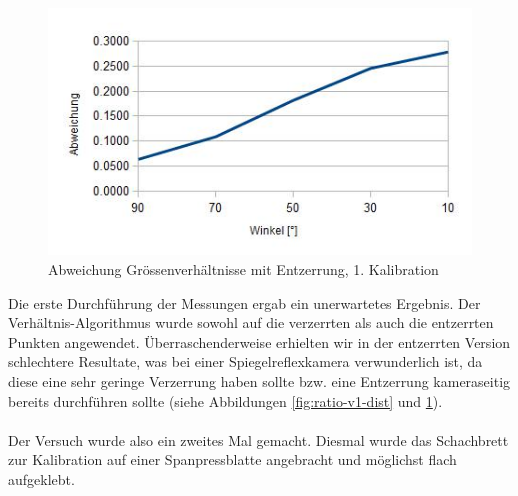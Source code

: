 \begin{figure}[!ht]
  \centering
  \includegraphics[width=0.75\linewidth]{images/ratio_v1_undist.jpg}
  \caption{Abweichung Grössenverhältnisse mit Entzerrung, 1. Kalibration}
  \label{fig:ratio-v1-undist}
\end{figure}


Die erste Durchführung der Messungen ergab ein unerwartetes Ergebnis. Der Verhältnis-Algorithmus wurde sowohl auf die verzerrten als auch die entzerrten Punkten angewendet. Überraschenderweise erhielten wir in der entzerrten Version schlechtere Resultate, was bei einer Spiegelreflexkamera verwunderlich ist, da diese eine sehr geringe Verzerrung haben sollte bzw. eine Entzerrung kameraseitig bereits durchführen sollte (siehe Abbildungen \ref{fig:ratio-v1-dist} und \ref{fig:ratio-v1-undist}).
\\
\\
Der Versuch wurde also ein zweites Mal gemacht. Diesmal wurde das Schachbrett zur Kalibration auf einer Spanpressblatte angebracht und möglichst flach aufgeklebt.


\begin{center}
\end{center}

